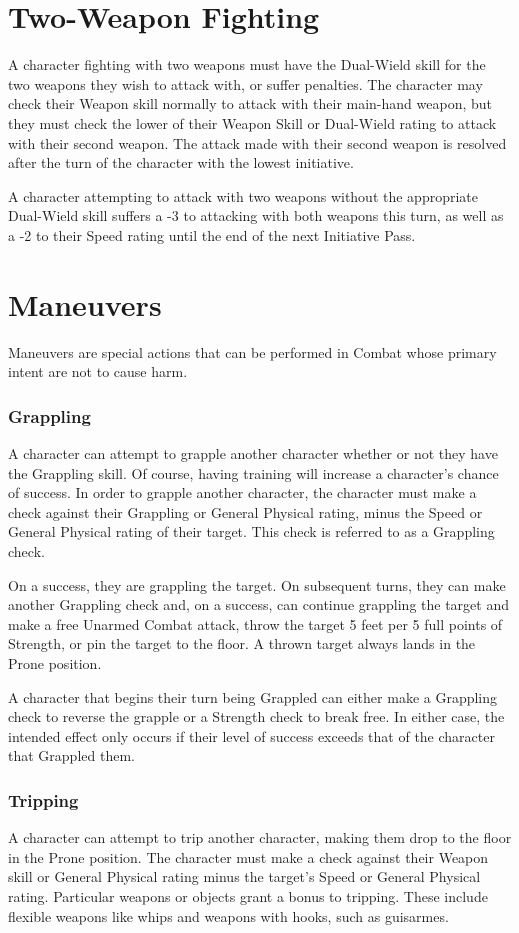 \documentclass[oneside]{book}
\begin{document}
\begin{multicols}{2}
\section{Two-Weapon Fighting}
A character fighting with two weapons must have the Dual-Wield skill for the two weapons they wish to attack with, or suffer penalties. The character may check their Weapon skill normally to attack with their main-hand weapon, but they must check the lower of their Weapon Skill or Dual-Wield rating to attack with their second weapon. The attack made with their second weapon is resolved after the turn of the character with the lowest initiative. 

A character attempting to attack with two weapons without the appropriate Dual-Wield skill suffers a -3 to attacking with both weapons this turn, as well as a -2 to their Speed rating until the end of the next Initiative Pass. 

\section{Maneuvers}
Maneuvers are special actions that can be performed in Combat whose primary intent are not to cause harm. 

\subsubsection{Grappling}
A character can attempt to grapple another character whether or not they have the Grappling skill. Of course, having training will increase a character's chance of success. In order to grapple another character, the character must make a check against their Grappling or General Physical rating, minus the Speed or General Physical rating of their target. This check is referred to as a Grappling check. 

On a success, they are grappling the target. On subsequent turns, they can make another Grappling check and, on a success, can continue grappling the target and make a free Unarmed Combat attack, throw the target 5 feet per 5 full points of Strength, or pin the target to the floor. A thrown target always lands in the Prone position.

A character that begins their turn being Grappled can either make a Grappling check to reverse the grapple or a Strength check to break free. In either case, the intended effect only occurs if their level of success exceeds that of the character that Grappled them. 

\subsubsection{Tripping}
A character can attempt to trip another character, making them drop to the floor in the Prone position. The character must make a check against their Weapon skill or General Physical rating minus the target's Speed or General Physical rating. Particular weapons or objects grant a bonus to tripping. These include flexible weapons like whips and weapons with hooks, such as guisarmes.


\end{multicols}
\end{document}
